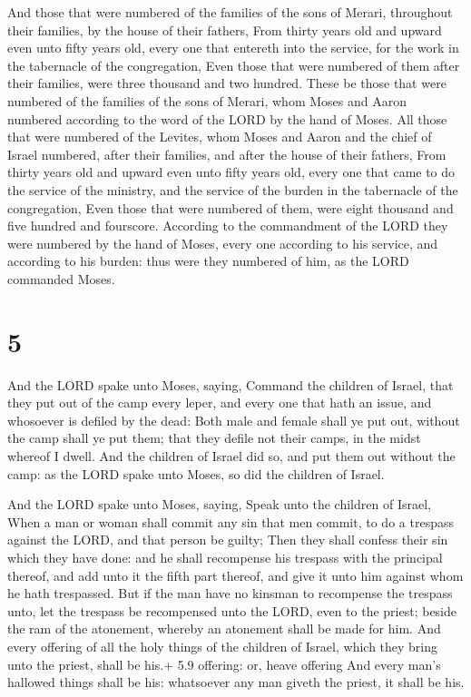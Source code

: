  And those that were numbered of the families of the sons
of Merari, throughout their families, by the house of their fathers,
 From thirty years old and upward even unto fifty years
old, every one that entereth into the service, for the work in the
tabernacle of the congregation,  Even those that were
numbered of them after their families, were three thousand and two
hundred.  These be those that were numbered of the families
of the sons of Merari, whom Moses and Aaron numbered according to the
word of the LORD by the hand of Moses.  All those that were
numbered of the Levites, whom Moses and Aaron and the chief of Israel
numbered, after their families, and after the house of their fathers,
 From thirty years old and upward even unto fifty years
old, every one that came to do the service of the ministry, and the
service of the burden in the tabernacle of the congregation,
 Even those that were numbered of them, were eight thousand
and five hundred and fourscore.  According to the
commandment of the LORD they were numbered by the hand of Moses, every
one according to his service, and according to his burden: thus were
they numbered of him, as the LORD commanded Moses.

\hypertarget{section-4}{%
\section{5}\label{section-4}}

 And the LORD spake unto Moses, saying,  Command
the children of Israel, that they put out of the camp every leper, and
every one that hath an issue, and whosoever is defiled by the dead:
 Both male and female shall ye put out, without the camp
shall ye put them; that they defile not their camps, in the midst
whereof I dwell.  And the children of Israel did so, and put
them out without the camp: as the LORD spake unto Moses, so did the
children of Israel.

 And the LORD spake unto Moses, saying,  Speak
unto the children of Israel, When a man or woman shall commit any sin
that men commit, to do a trespass against the LORD, and that person be
guilty;  Then they shall confess their sin which they have
done: and he shall recompense his trespass with the principal thereof,
and add unto it the fifth part thereof, and give it unto him against
whom he hath trespassed.  But if the man have no kinsman to
recompense the trespass unto, let the trespass be recompensed unto the
LORD, even to the priest; beside the ram of the atonement, whereby an
atonement shall be made for him.  And every offering of all
the holy things of the children of Israel, which they bring unto the
priest, shall be his.+ 5.9 offering: or, heave offering 
And every man's hallowed things shall be his: whatsoever any man giveth
the priest, it shall be his.


